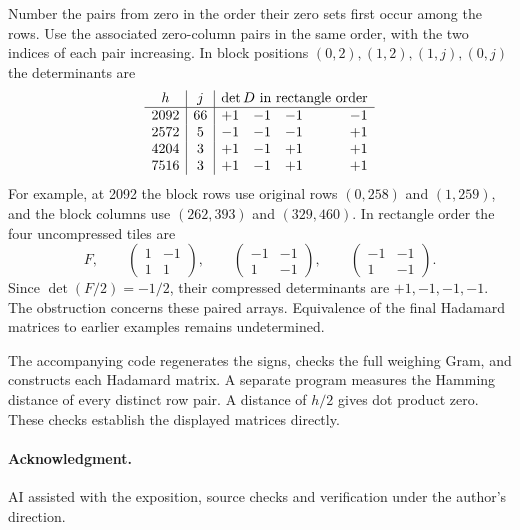 \documentclass[10pt]{article}
\begin{document}
Number the pairs from zero in the order their zero sets first occur among the rows. Use the associated zero-column pairs in the same order, with the two indices of each pair increasing. In block positions $(0,2),(1,2),(1,j),(0,j)$ the determinants are
\[
\begin{array}{c|c|rrrr}
h&j&\multicolumn{4}{c}{\det D\ \text{in rectangle order}}\\ \hline
2092&66&+1&-1&-1&-1\\
2572&5 &-1&-1&-1&+1\\
4204&3 &+1&-1&+1&+1\\
7516&3 &+1&-1&+1&+1
\end{array}
\]
For example, at 2092 the block rows use original rows $(0,258)$ and $(1,259)$, and the block columns use $(262,393)$ and $(329,460)$. In rectangle order the four uncompressed tiles are
\[
 F,\qquad
 \begin{pmatrix}1&-1\\1&1\end{pmatrix},\qquad
 \begin{pmatrix}-1&-1\\1&-1\end{pmatrix},\qquad
 \begin{pmatrix}-1&-1\\1&-1\end{pmatrix}.
\]
Since $\det(F/2)=-1/2$, their compressed determinants are $+1,-1,-1,-1$. The obstruction concerns these paired arrays. Equivalence of the final Hadamard matrices to earlier examples remains undetermined.

The accompanying code regenerates the signs, checks the full weighing Gram, and constructs each Hadamard matrix. A separate program measures the Hamming distance of every distinct row pair. A distance of $h/2$ gives dot product zero. These checks establish the displayed matrices directly.

\paragraph{Acknowledgment.} AI assisted with the exposition, source checks and verification under the author's direction.
\end{document}
